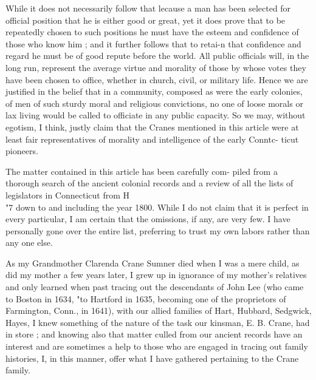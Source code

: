 \documentclass{book}
\begin{document}
While it does not necessarily follow that lecause a man has 
been selected for official position that he is either good or great, 
yet it does prove that to be repeatedly chosen to such positions 
he must have the esteem and confidence of those who know him ; 
and it further follows that to retai-n that confidence and regard 
he must be of good repute before the world. All public officials 
will, in the long run, represent the average virtue and morality 
of those by whose votes they have been chosen to office, whether 
in church, civil, or military life. Hence we are justified in the 
belief that in a community, composed as were the early colonies, 
of men of such sturdy moral and religious convictions, no one of 
loose morals or lax living would be called to officiate in any 
public capacity. So we may, without egotism, I think, justly 
claim that the Cranes mentioned in this article were at least fair 
representatives of morality and intelligence of the early Conntc- 
ticut pioneers. 

The matter contained in this article has been carefully com- 
piled from a thorough search of the ancient colonial records and 
a review of all the lists of legislators in Connecticut from H\\"7 
down to and including the year 1800. While I do not claim that 
it is perfect in every particular, I am certain that the omissions, 
if any, are very few. I have personally gone over the entire list, 
preferring to trust my own labors rather than any one else. 




As my Grandmother Clarenda Crane Sumner died when I was 
a mere child, as did my mother a few years later, I grew up in 
ignorance of my mother's relatives and only learned when past 
tracing out the descendants of John Lee (who came to Boston in 
1634, "to Hartford in 1635, becoming one of the proprietors of 
Farmington, Conn., in 1641), with our allied families of Hart, 
Hubbard, Sedgwick, Hayes, I knew something of the nature of 
the task our kinsman, E. B. Crane, had in store ; and knowing 
also that matter culled from our ancient records have an interest 
and are sometimes a help to those who are engaged in tracing out 
family histories, I, in this manner, offer what I have gathered 
pertaining to the Crane family. 
\end{document}
